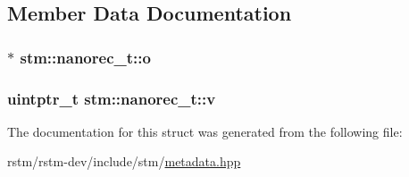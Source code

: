 \subsection{Member Data Documentation}
\hypertarget{structstm_1_1nanorec__t_af7f5825e4452ca965598c001779823c7}{
\subsubsection[{o}]{$\ast$ stm\-::nanorec\-\_\-t\-::o}}\label{structstm_1_1nanorec__t_af7f5825e4452ca965598c001779823c7}
\hypertarget{structstm_1_1nanorec__t_a8eed9b4b7f98efe10f5dfa142a1e7097}{
\subsubsection[{v}]{\setlength{\rightskip}{0pt plus 5cm}uintptr\-\_\-t stm\-::nanorec\-\_\-t\-::v}}\label{structstm_1_1nanorec__t_a8eed9b4b7f98efe10f5dfa142a1e7097}


The documentation for this struct was generated from the following file\-:\begin{DoxyCompactItemize}
\item 
rstm/rstm-\/dev/include/stm/\hyperlink{metadata_8hpp}{metadata.\-hpp}\end{DoxyCompactItemize}
